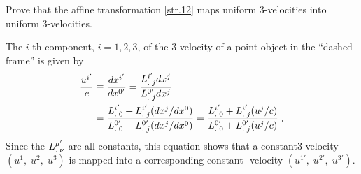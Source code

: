 \begin{small}
\exm Prove that the affine transformation \eqref{str.12} 
maps uniform 3-velocities into uniform 3-velocities. 

\soln The $i$-th component, $i=1,2,3 $, of the 3-velocity 
of a point-object in the ``dashed-frame'' is given by
\begin{align*}
\frac{u^{i'}}{c}&\equiv \frac{dx^{i'}}{dx^{0'}} =
\frac{{{L}^{i'}_{.\;j}} dx^j}{{{L}^{0'}_{.\;j}} dx^j}
\\&=\frac{{{L}^{i'}_{.\;0}} + {{L}^{i'}_{.\;j}}(dx^j/ dx^0)}
{{{L}^{0'}_{.\;0}} + {{L}^{0'}_{.\;j}}(dx^j/dx^0)}
=\frac{{{L}^{i'}_{.\;0}} + {{L}^{i'}_{.\;j}}(u^j /c)}
{{{L}^{0'}_{.\;0}}+{{L}^{0'}_{.\;j}}(u^j /c) }\;.
\end{align*}
Since the ${{L}^{{\mu'}}_{.\;{\nu}}}$ are all constants, this 
equation shows that  a constant\break \mbox{3-velocity} $(u^1,\; 
u^2,\;u^3)$ is mapped into a corresponding constant 
-velocity $(u^{1'},\; u^{2'},\; u^{3'})$.
\ebx


\end{small}
